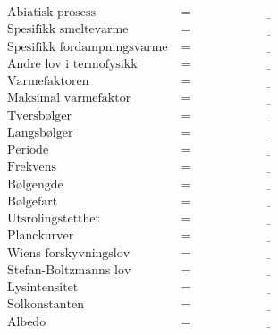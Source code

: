 \documentclass{article}
\begin{document}
\begin{align*}
    \text{Abiatisk prosess} &= \underline{\hspace{5cm}} \\
    \text{Spesifikk smeltevarme} &= \underline{\hspace{5cm}} \\
    \text{Spesifikk fordampningsvarme} &= \underline{\hspace{5cm}} \\
    \text{Andre lov i termofysikk} &= \underline{\hspace{5cm}} \\
    \text{Varmefaktoren} &= \underline{\hspace{5cm}} \\
    \text{Maksimal varmefaktor} &= \underline{\hspace{5cm}} \\
    \text{Tversb\o lger} &= \underline{\hspace{5cm}} \\
    \text{Langsb\o lger} &= \underline{\hspace{5cm}} \\
    \text{Periode} &= \underline{\hspace{5cm}} \\
    \text{Frekvens} &= \underline{\hspace{5cm}} \\
    \text{B\o lgengde} &= \underline{\hspace{5cm}} \\
    \text{B\o lgefart} &= \underline{\hspace{5cm}} \\
    \text{Utsrolingstetthet} &= \underline{\hspace{5cm}} \\
    \text{Planckurver} &= \underline{\hspace{5cm}} \\
    \text{Wiens forskyvningslov} &= \underline{\hspace{5cm}} \\
    \text{Stefan-Boltzmanns lov} &= \underline{\hspace{5cm}} \\
    \text{Lysintensitet} &= \underline{\hspace{5cm}} \\
    \text{Solkonstanten} &= \underline{\hspace{5cm}} \\
    \text{Albedo} &= \underline{\hspace{5cm}} \\

\end{align*}
\end{document}
